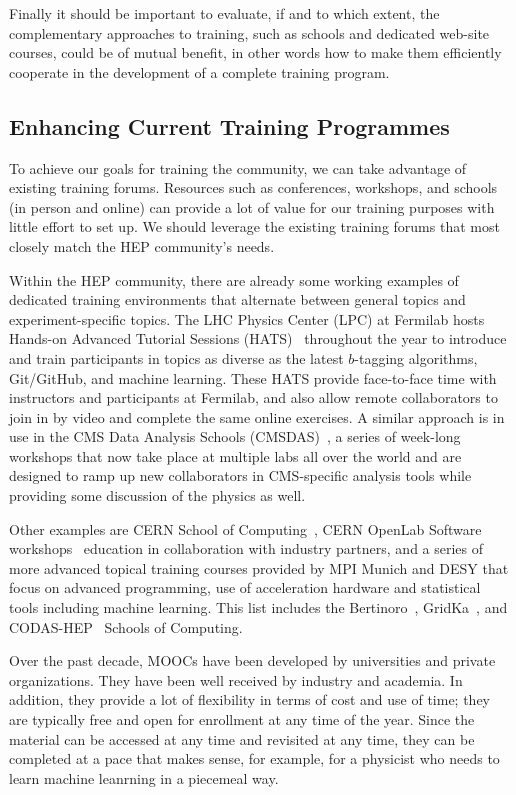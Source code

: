 \documentclass[12pt,a4paper]{article}
\begin{document}
Finally it should be important to evaluate, if and to which extent, the
complementary approaches to training, such as schools and dedicated web-site
courses, could be of mutual benefit, in other words how to make them efficiently cooperate in the
development of a complete training program.


\subsection{Enhancing Current Training Programmes}
\label{sec:ehcurtrainprog}

To achieve our goals for training the community, we can take advantage of
existing training forums. Resources such as conferences, workshops, and schools
(in person and online) can provide a lot of value for our training purposes with
little effort to set up. We should leverage the existing training forums that
most closely match the HEP community's needs.

Within the HEP community, there are already some working examples of dedicated
training environments that alternate between general topics and
experiment-specific topics. The LHC Physics Center (LPC) at Fermilab hosts
Hands-on Advanced Tutorial Sessions
(HATS)~\cite{LPCHandsOn}
throughout the year to introduce and train participants in topics as diverse as
the latest $b$-tagging algorithms, Git/GitHub, and machine learning. These HATS
provide face-to-face time with instructors and participants at Fermilab, and
also allow remote collaborators to join in by video and complete the same online
exercises. A similar approach is in use in the CMS Data Analysis Schools
(CMSDAS)~\cite{LPCDataAnalysis},
a series of week-long workshops that now take place at multiple labs all over
the world and are designed to ramp up new collaborators in CMS-specific analysis
tools while providing some discussion of the physics as well.

Other examples are CERN School of Computing~\cite{CERNSchoolOfComputing}, 
CERN OpenLab Software workshops~\cite{OPENLab} education in collaboration with
industry partners, and a series of more advanced topical training courses
provided by MPI Munich and DESY that focus on advanced programming, use of
acceleration hardware and statistical tools including machine learning. This
list includes the
Bertinoro~\cite{Bertinoro}, 
GridKa~\cite{GridKa}, and
CODAS-HEP~\cite{CODAS-HEP} Schools of Computing.

Over the past decade, MOOCs have been developed by universities and private organizations. 
They have been well received by industry and academia.
In addition, they provide a lot of flexibility in terms of cost and use of time; 
they are typically free and open for enrollment at any time of the
year. Since the material can be accessed at any time and revisited at any time,
they can be completed at a pace that makes sense, for example, for a physicist
who needs to learn machine leanrning in a piecemeal way.
\end{document}
